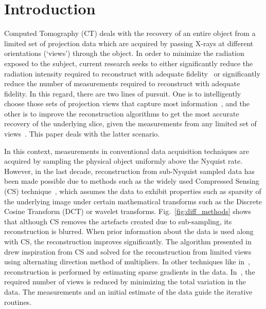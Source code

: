 \documentclass[journal]{IEEEtran}
\begin{document}
%
\IEEEpeerreviewmaketitle



\section{Introduction}
\label{sec:intro}
Computed Tomography (CT) deals with the recovery of an entire object from a limited set of projection data which are acquired by passing X-rays at different orientations (`views') through the object. In order to minimize the radiation exposed to the subject, current research seeks to either significantly reduce the radiation intensity required to reconstruct with adequate fidelity~\cite{gopal2019low} or significantly reduce the number of measurements required to reconstruct with adequate fidelity. In this regard, there are two lines of pursuit. One is to intelligently choose those sets of projection views that capture most information~\cite{King2018,Anthony2018,barkan17,fischer16,andrei14}, and the other is to improve the reconstruction algorithms to get the most accurate recovery of the underlying slice, given the measurements from any limited set of views~\cite{yang2018,geyer2015,kilic2011}. This paper deals with the latter scenario.

In this context, measurements in conventional data acquisition techniques are acquired by sampling the physical object uniformly above the Nyquist rate. However, in the last decade, reconstruction from sub-Nyquist sampled data has been made possible due to methods such as the widely used Compressed Sensing (CS) technique~\cite{Donoho,introCS}, which assumes the data to exhibit properties such as sparsity of the underlying image under certain mathematical transforms such as the Discrete Cosine Transform (DCT) or wavelet transforms. Fig.~\ref{fig:diff_methods} shows that although CS removes the artefacts created due to sub-sampling, its reconstruction is blurred. When prior information about the data is used along with CS, the reconstruction improves significantly. The algorithm presented in~\cite{Essam2015} drew inspiration from CS and solved for the reconstruction from limited views using alternating direction method of multipliers. In other techniques like in~\cite{Polak2017}, reconstruction is performed by estimating sparse gradients in the data. In~\cite{Li2015}, the required number of views is reduced by minimizing the total variation in the data. The measurements and an initial estimate of the data guide the iterative routines. 
\end{document}

